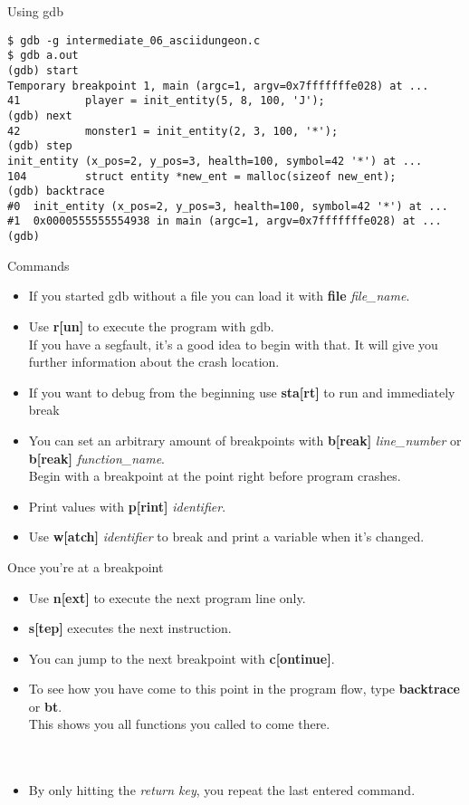\documentclass[10pt,graphics,aspectratio=169,table]{beamer}
\begin{document}
\begin{frame}[fragile]{Using gdb}
    \begin{lstlisting}
$ gdb -g intermediate_06_asciidungeon.c
$ gdb a.out
(gdb) start
Temporary breakpoint 1, main (argc=1, argv=0x7fffffffe028) at ...
41          player = init_entity(5, 8, 100, 'J');
(gdb) next
42          monster1 = init_entity(2, 3, 100, '*');
(gdb) step
init_entity (x_pos=2, y_pos=3, health=100, symbol=42 '*') at ...
104         struct entity *new_ent = malloc(sizeof new_ent);
(gdb) backtrace 
#0  init_entity (x_pos=2, y_pos=3, health=100, symbol=42 '*') at ...
#1  0x0000555555554938 in main (argc=1, argv=0x7fffffffe028) at ...
(gdb)    
\end{lstlisting}

\end{frame}
\begin{frame}{Commands}
	\begin{itemize}
        \item If you started gdb without a file you can load it with
            \textbf{file} \textit{file\_name}.
		\item Use \textbf{r[un]} to execute the program with gdb.\\
            If you have a segfault, it's a good idea to begin with that.
            It will give you further information about the crash location.
        \item If you want to debug from the beginning use \textbf{sta[rt]}
            to run and immediately break\\
        \item You can set an arbitrary amount of breakpoints
            with \textbf{b[reak]} \textit{line\_number} or \textbf{b[reak]} \textit{function\_name}.\\
		    Begin with a breakpoint at the point right before program crashes.
		\item Print values with \textbf{p[rint]} \textit{identifier}.
        \item Use \textbf{w[atch]} \textit{identifier} to break and print
            a variable when it's changed.
	\end{itemize}
\end{frame}
\begin{frame}{Once you're at a breakpoint}
	\begin{itemize}
		\item Use \textbf{n[ext]} to execute the next program line only.
		\item \textbf{s[tep]} executes the next instruction.
		\item You can jump to the next breakpoint with \textbf{c[ontinue]}.
		\item To see how you have come to this point in the program flow, type \textbf{backtrace} or \textbf{bt}.\\
		This shows you all functions you called to come there.
		\\\ \\ \\
		\item By only hitting the \textit{return key}, you repeat the last entered  command.
	\end{itemize}
	
\end{frame}
\end{document}
